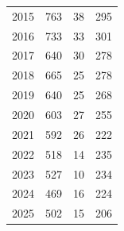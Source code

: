 \begin{apendicesenv}
{\begin{longtable}{@{}rrrr@{}}
2015 & 763 & 38 & 295 \\
2016 & 733 & 33 & 301 \\
2017 & 640 & 30 & 278 \\
2018 & 665 & 25 & 278 \\
2019 & 640 & 25 & 268 \\
2020 & 603 & 27 & 255 \\
2021 & 592 & 26 & 222 \\
2022 & 518 & 14 & 235 \\
2023 & 527 & 10 & 234 \\
2024 & 469 & 16 & 224 \\
2025 & 502 & 15 & 206 \\
\end{longtable}}
\vspace{-6pt}



\end{apendicesenv}
